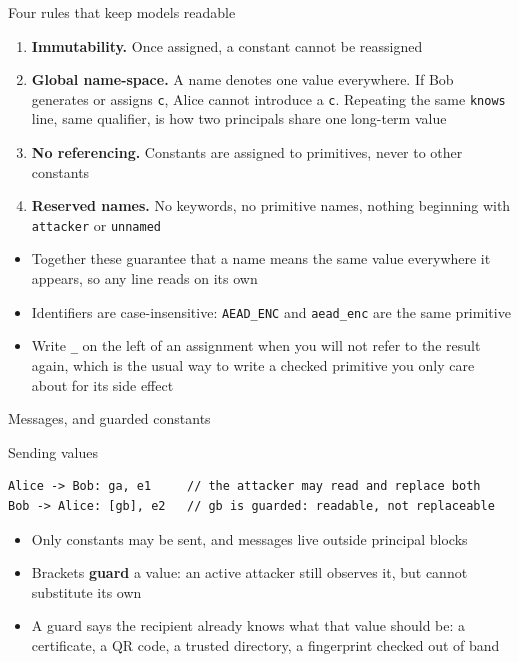 \ifdefined\PRESENTATION\else\PassOptionsToClass{handout}{beamer}\fi\documentclass[aspectratio=169, lualatex]{beamer}
\begin{document}
\begin{frame}{Four rules that keep models readable}
	\begin{enumerate}
		\item \textbf{Immutability.} Once assigned, a constant cannot be reassigned
		\item \textbf{Global name-space.} A name denotes one value everywhere. If Bob generates or assigns \texttt{c}, Alice cannot introduce a \texttt{c}. Repeating the same \texttt{knows} line, same qualifier, is how two principals share one long-term value
		\item \textbf{No referencing.} Constants are assigned to primitives, never to other constants
		\item \textbf{Reserved names.} No keywords, no primitive names, nothing beginning with \texttt{attacker} or \texttt{unnamed}
	\end{enumerate}
	\vspace{0.3em}
	\begin{itemize}
		\item Together these guarantee that a name means the same value everywhere it appears, so any line reads on its own
		\item Identifiers are case-insensitive: \texttt{AEAD\_ENC} and \texttt{aead\_enc} are the same primitive
		\item Write \texttt{\_} on the left of an assignment when you will not refer to the result again, which is the usual way to write a checked primitive you only care about for its side effect
	\end{itemize}
\end{frame}

\begin{frame}[fragile]{Messages, and guarded constants}
	\begin{vpmodel}{Sending values}
		\begin{lstlisting}
Alice -> Bob: ga, e1     // the attacker may read and replace both
Bob -> Alice: [gb], e2   // gb is guarded: readable, not replaceable
\end{lstlisting}
	\end{vpmodel}
	\vspace{0.2em}
	\footnotesize
	\begin{itemize}
		\item Only constants may be sent, and messages live outside principal blocks
		\item Brackets \textbf{guard} a value: an active attacker still observes it, but cannot substitute its own
		\item A guard says the recipient already knows what that value should be: a certificate, a QR code, a trusted directory, a fingerprint checked out of band
	\end{itemize}
	\vspace{0.2em}
\end{frame}
\end{document}
